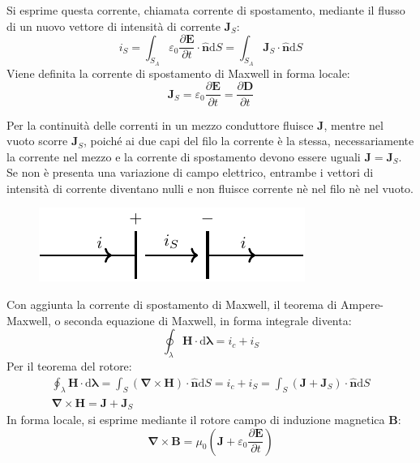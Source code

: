 \documentclass{article}
\newcommand{\vect}[1]{\boldsymbol{\mathbf{#1}}}
\newcommand{\df}{\mathrm{d}}
\numberwithin{equation}{subsection}
\begin{document}
Si esprime questa corrente, chiamata corrente di spostamento, mediante il flusso di un nuovo vettore di intensità di corrente $\vect{J}_S$:
\begin{equation*}
    i_S=\displaystyle\int_{S_A}\varepsilon_0\frac{\partial \vect{E}}{\partial t}\cdot\hat{\vect{n}}\df S=\int_{S_A}\vect{J}_S\cdot\hat{\vect{n}}\df S
\end{equation*}
Viene definita la corrente di spostamento di Maxwell in forma locale:
\begin{equation}
    \vect{J}_S=\displaystyle\varepsilon_0\frac{\partial \vect{E}}{\partial t}=\frac{\partial \vect{D}}{\partial t}
\end{equation}

Per la continuità delle correnti in un mezzo conduttore fluisce $\vect{J}$, mentre nel vuoto scorre $\vect{J}_S$, poiché ai due capi del filo la corrente è la stessa, necessariamente 
la corrente nel mezzo e la corrente di spostamento devono essere uguali $\vect{J}=\vect{J}_S$. Se non è presenta una variazione di campo elettrico, entrambe i vettori 
di intensità di corrente diventano nulli e non fluisce corrente nè nel filo nè nel vuoto.  

\begin{figure}[H]%
    \centering
    \includegraphics{corrente-filo-reciso.pdf}%
    \label{fig:corrente-filo-reciso}
\end{figure}

Con aggiunta la corrente di spostamento di Maxwell, il teorema di Ampere-Maxwell, o seconda equazione di Maxwell, in forma integrale diventa:
\begin{equation*}
    \oint_{\lambda}\vect{H}\cdot \df\vect{\lambda}=i_c+i_S
\end{equation*}
Per il teorema del rotore:
\begin{gather*}
    \displaystyle\oint_{\lambda}\vect{H}\cdot \df\vect{\lambda}=\int_S(\vect\nabla\times\vect{H})\cdot\hat{\vect{n}}\df S=i_c+i_S=\int_S(\vect{J}+\vect{J}_S)\cdot\hat{\vect{n}}\df S\\
    \vect\nabla\times\vect{H}=\vect{J}+\vect{J}_S
\end{gather*}
In forma locale, si esprime mediante il rotore campo di induzione magnetica $\vect{B}$:
\begin{equation}
    \vect\nabla\times\vect{B}=\mu_0\left(\vect{J}+\varepsilon_0\displaystyle\frac{\partial \vect{E}}{\partial t}\right)
\end{equation}
\end{document}
